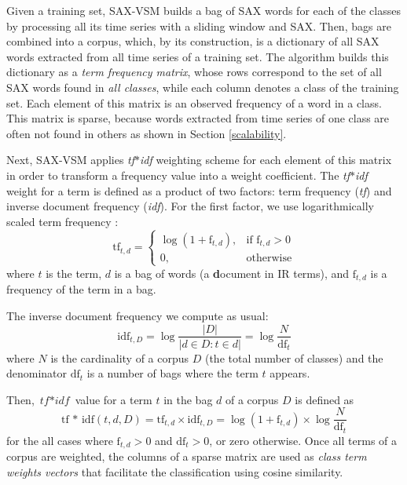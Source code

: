 \documentclass[conference]{IEEEtran}
\begin{document}
Given a training set, SAX-VSM builds a bag of SAX words for each of the 
classes by processing all its time series with a sliding window and SAX. 
Then, bags are combined into a corpus, which, by its construction, 
is a dictionary of all SAX words extracted from all time series of a training set.
The algorithm builds this dictionary as a \textit{term frequency matrix}, whose
rows correspond to the set of all SAX words found in \textit{all classes}, 
while each column denotes a class of the training set. 
Each element of this matrix is an observed frequency of a word in a class. 
This matrix is sparse, because words extracted from time series of one class 
are often not found in others as shown in Section \ref{scalability}. 

Next, SAX-VSM applies \textit{tf$\ast$idf} weighting scheme for each element 
of this matrix in order to transform a frequency value into a weight coefficient. 
The \textit{tf$\ast$idf} weight for a term is defined as a 
product of two factors: term frequency (\textit{tf}) and inverse document 
frequency (\textit{idf}). 
For the first factor, we use logarithmically scaled term frequency \cite{logtf}:
\begin{equation}
 \mbox{tf}_{t, d} =  \begin{cases} \log(1 + \mbox{f}_{t,d}), &\mbox{if f}_{t,d}>0  \\
0, & \mbox{otherwise} \end{cases}
\end{equation} 
where $t$ is the term, $d$ is a bag of words (a \textbf{d}ocument in IR terms), 
and $\mbox{f}_{t,d}$ is a frequency of the term in a bag.

The inverse document frequency we compute as usual:
\begin{equation}
 \mbox{idf}_{t, D} =  \log\frac{|D|}{|d \in D : t \in d|} = \log\frac{N}{\mbox{df}_{t}}
 \label{formula:idf}
\end{equation} 
where $N$ is the cardinality of a corpus $D$ (the total number of classes) and the 
denominator $\mbox{df}_{t}$ is a number of bags where the term $t$ appears.

Then, $\textit{tf$\ast$idf}$ value for a term $t$ in the bag $d$ of a corpus $D$ is defined as 
\begin{equation}
 \mbox{tf * idf}(t, d, D) =  \mbox{tf}_{t, d} \times \mbox{idf}_{t, D} = \log(1 + \mbox{f}_{t,d})
\times \log\frac{N}{\mbox{df}_{t}}
 \label{formula:tfidf}
\end{equation} 
for the all cases where $\mbox{f}_{t,d}>0$ and $\mbox{df}_{t}>0$, or zero otherwise.
Once all terms of a corpus are weighted, the columns of a sparse matrix are used 
as \textit{class term weights vectors} that facilitate the classification using cosine similarity. 
\end{document}
